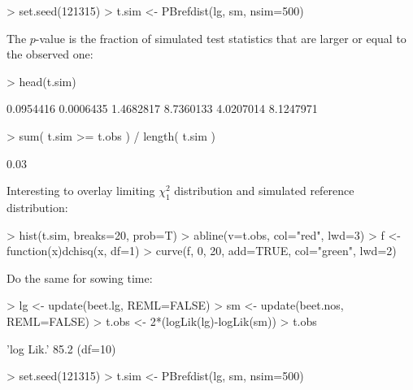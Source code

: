 \begin{sframe}

\begin{Schunk}
\begin{Sinput}
> set.seed(121315)
> t.sim <- PBrefdist(lg, sm, nsim=500)
\end{Sinput}
\end{Schunk}
  
The $p$-value
is the fraction of simulated test statistics that are larger or equal to the
observed one:

\begin{Schunk}
\begin{Sinput}
> head(t.sim)
\end{Sinput}
\begin{Soutput}
[1] 0.0954416 0.0006435 1.4682817 8.7360133 4.0207014 8.1247971
\end{Soutput}
\begin{Sinput}
> sum( t.sim >= t.obs ) / length( t.sim )
\end{Sinput}
\begin{Soutput}
[1] 0.03
\end{Soutput}
\end{Schunk}
\end{sframe}

\begin{sframe}

  Interesting to overlay limiting $\chi^2_1$
  distribution and simulated reference distribution:
  
\begin{Schunk}
\begin{Sinput}
> hist(t.sim, breaks=20, prob=T)
> abline(v=t.obs, col="red", lwd=3)
> f <- function(x){dchisq(x, df=1)}
> curve(f, 0, 20, add=TRUE, col="green", lwd=2)
\end{Sinput}
\end{Schunk}
  
\end{sframe}


\begin{sframe}
Do the same for sowing time:

\begin{Schunk}
\begin{Sinput}
> lg <- update(beet.lg, REML=FALSE)
> sm <- update(beet.nos, REML=FALSE)
> t.obs <- 2*(logLik(lg)-logLik(sm))
> t.obs
\end{Sinput}
\begin{Soutput}
'log Lik.' 85.2 (df=10)
\end{Soutput}
\end{Schunk}


\begin{Schunk}
\begin{Sinput}
> set.seed(121315)
> t.sim <- PBrefdist(lg, sm, nsim=500)
\end{Sinput}
\end{Schunk}

  
\end{sframe}

